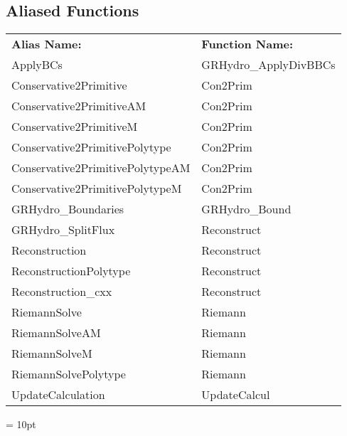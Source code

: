 \subsection*{Aliased Functions}

\hspace{5mm}

 \begin{tabular*}{160mm}{ll} 

{\bf Alias Name:} ~~~~~~~ & {\bf Function Name:} \\ 
ApplyBCs & GRHydro\_ApplyDivBBCs \\ 
Conservative2Primitive & Con2Prim \\ 
Conservative2PrimitiveAM & Con2Prim \\ 
Conservative2PrimitiveM & Con2Prim \\ 
Conservative2PrimitivePolytype & Con2Prim \\ 
Conservative2PrimitivePolytypeAM & Con2Prim \\ 
Conservative2PrimitivePolytypeM & Con2Prim \\ 
GRHydro\_Boundaries & GRHydro\_Bound \\ 
GRHydro\_SplitFlux & Reconstruct \\ 
Reconstruction & Reconstruct \\ 
ReconstructionPolytype & Reconstruct \\ 
Reconstruction\_cxx & Reconstruct \\ 
RiemannSolve & Riemann \\ 
RiemannSolveAM & Riemann \\ 
RiemannSolveM & Riemann \\ 
RiemannSolvePolytype & Riemann \\ 
UpdateCalculation & UpdateCalcul \\ 
\end{tabular*} 



\vspace{5mm}\parskip = 10pt 

